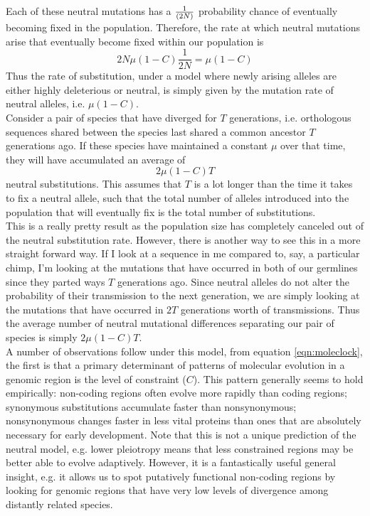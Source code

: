 Each of these neutral mutations has a $\nicefrac{1}{(2N)}$ probability chance of
eventually becoming fixed in the population. Therefore, the rate at
which neutral mutations arise that eventually become fixed within our
population is  
\begin{equation}
2N\mu(1-C)\frac{1}{2N} = \mu(1-C)
\end{equation}
Thus the rate of substitution, under a model where newly arising alleles are either
highly deleterious or neutral, is simply given by the mutation rate
of neutral alleles, i.e. $\mu(1-C)$.\\

Consider a pair of species that have diverged for $T$ generations, i.e. orthologous sequences shared between the species last shared a common ancestor $T$ generations ago. If these species have maintained a constant $\mu$ over that time, they will have accumulated an average of
\begin{equation}
2\mu(1-C)T \label{eqn:moleclock}
\end{equation}
neutral substitutions. This assumes that $T$ is a lot longer than the time it
takes to fix a neutral allele, such that the total number of 
alleles introduced into the population that will eventually fix is the
total number of substitutions.\\

This is a really pretty result as the population size has completely canceled
out of the neutral substitution rate. However, there is another way to see this
in a more straight forward way. If I look at a sequence in me compared to, say, a
particular chimp, I'm looking at the mutations that have occurred in both of
our germlines since they parted ways $T$ generations ago. Since neutral alleles
do not alter the probability of their transmission to the next generation, we
are simply looking at the mutations that have occurred in $2T$ generations
worth of transmissions. Thus the average number of neutral mutational
differences separating our pair of species is simply $2\mu (1-C) T$.\\

A number of observations follow under this model, from equation \eqref{eqn:moleclock}, the first is that a primary determinant of patterns of molecular evolution in a genomic region is the level of constraint ($C$). This pattern generally seems to hold empirically: non-coding regions often evolve more rapidly than coding regions; synonymous substitutions accumulate faster than nonsynonymous; nonsynonymous changes faster in less vital proteins than ones that are absolutely necessary for early development. Note that this is not a unique prediction of the neutral model, e.g. lower pleiotropy means that less constrained regions may be better able to evolve adaptively. However, it is a fantastically useful general insight, e.g. it allows us to spot putatively functional non-coding regions by looking for genomic regions that have very low levels of divergence among distantly related species.

